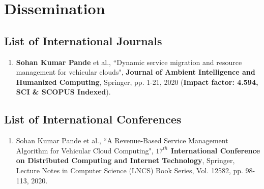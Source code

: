 \setcounter{equation}{0}
\thispagestyle{plain}
\renewcommand{\chaptermark}[1]{ \markboth{#1}{} }
\renewcommand{\sectionmark}[1]{ \markright{#1} }
\renewcommand{\headrulewidth}{0.4pt} %
\renewcommand{\footrulewidth}{0.4pt}
\fancyfoot[RO,LE]{\thepage}

\chapter*{Dissemination}
\section*{List of International Journals}
\begin{enumerate}
	\item \textbf{Sohan Kumar Pande} et al., ``Dynamic service migration and resource management for vehicular clouds", \textbf{Journal of Ambient Intelligence and Humanized Computing}, Springer, pp. 1-21, 2020 (\textbf{Impact factor: 4.594, SCI \& SCOPUS Indexed}).
	
\end{enumerate}

\section*{List of International Conferences}
\begin{enumerate}	
	\item Sohan Kumar Pande et al., ``A Revenue-Based Service Management Algorithm for Vehicular Cloud Computing", \textbf{$17^{th}$ International Conference on Distributed Computing and Internet Technology}, Springer, Lecture Notes in Computer Science (LNCS) Book Series, Vol. 12582, pp. 98-113, 2020.	

\end{enumerate}